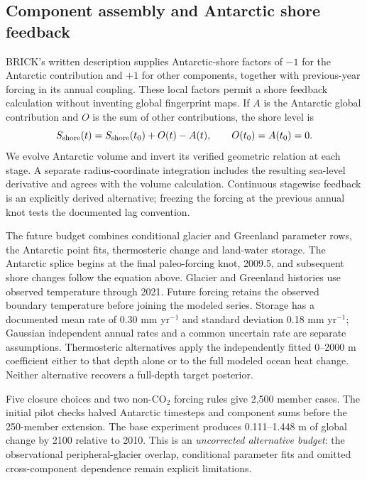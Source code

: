 \subsection{Component assembly and Antarctic shore feedback}
BRICK's written description supplies Antarctic-shore factors of $-1$ for the
Antarctic contribution and $+1$ for other components, together with previous-year
forcing in its annual coupling\cite{brick}. These local factors permit a shore
feedback calculation without inventing global fingerprint maps. If $A$ is the
Antarctic global contribution and $O$ is the sum of other contributions, the
shore level is
\begin{equation}
 S_{\rm shore}(t)=S_{\rm shore}(t_0)+O(t)-A(t),
 \qquad O(t_0)=A(t_0)=0.
\end{equation}
We evolve Antarctic volume and invert its verified geometric relation at each
stage. A separate radius-coordinate integration includes the resulting
sea-level derivative and agrees with the volume calculation. Continuous
stagewise feedback is an explicitly derived alternative; freezing the forcing
at the previous annual knot tests the documented lag convention.

The future budget combines conditional glacier and Greenland parameter rows,
the Antarctic point fits, thermosteric change and land-water storage. The
Antarctic splice begins at the final paleo-forcing knot, 2009.5, and subsequent
shore changes follow the equation above. Glacier and Greenland histories use
observed temperature through 2021. Future forcing retains the observed boundary
temperature before joining the modeled series. Storage has a documented mean
rate of 0.30 mm yr$^{-1}$ and standard deviation 0.18 mm yr$^{-1}$; Gaussian
independent annual rates and a common uncertain rate are separate assumptions.
Thermosteric alternatives apply the independently fitted 0--2000 m coefficient
either to that depth alone or to the full modeled ocean heat change. Neither
alternative recovers a full-depth target posterior.

Five closure choices and two non-CO$_2$ forcing rules give 2,500 member cases.
The initial pilot checks halved Antarctic timesteps and component sums before
the 250-member extension. The base experiment produces 0.111--1.448 m of global
change by 2100 relative to 2010. This is an \emph{uncorrected alternative budget}:
the observational peripheral-glacier overlap, conditional parameter fits and
omitted cross-component dependence remain explicit limitations.

